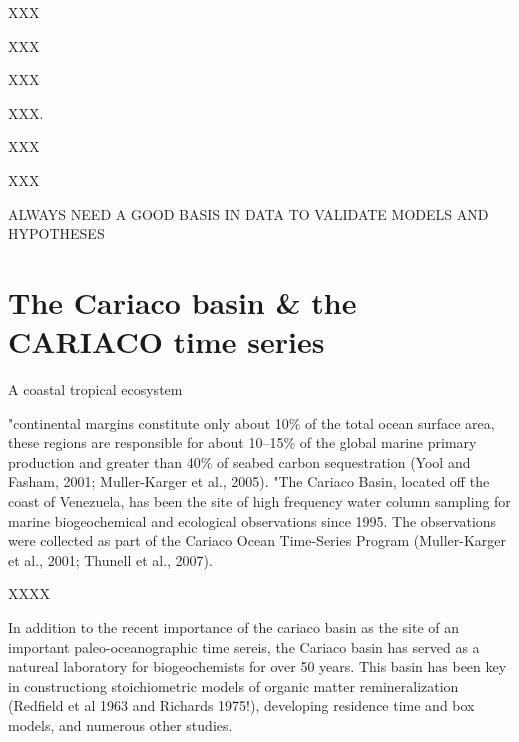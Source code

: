 XXX

XXX

XXX

XXX. 

XXX

XXX

ALWAYS NEED A GOOD BASIS IN DATA TO VALIDATE MODELS AND HYPOTHESES

\section{The Cariaco basin \& the CARIACO time series}

A coastal tropical ecosystem

"continental margins constitute only about 10\% of the total ocean surface area, these regions are responsible for about 10–15\% of the global marine primary production and greater than 40\% of seabed carbon sequestration (Yool and Fasham, 2001; Muller-Karger et al., 2005). 
"The Cariaco Basin, located off the coast of Venezuela, has been the site of high frequency water column sampling for marine biogeochemical and ecological observations since 1995. The observations were collected as part of the Cariaco Ocean Time-Series Program (Muller-Karger et al., 2001; Thunell et al., 2007). 

XXXX

In addition to the recent importance of the cariaco basin as the site of an important paleo-oceanographic time sereis, the Cariaco basin has served as a natureal laboratory for biogeochemists for over 50 years. This basin has been key in constructiong stoichiometric models of organic matter remineralization (Redfield et al 1963 and Richards 1975!), developing residence time and box models, and numerous other studies.

